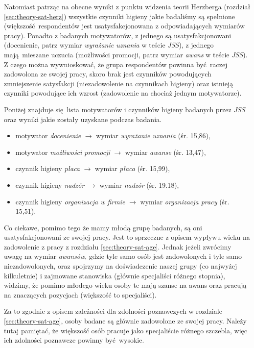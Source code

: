 Natomiast patrząc na obecne wyniki z punktu widzenia teorii Herzberga (rozdział \ref{sec:theory-sat-herz}) wszystkie czynniki higieny jakie badaliśmy są spełnione (większość respondentów jest usatysfakcjonowana z odpowiadających wymiarów pracy). Ponadto z badanych motywatorów, z jednego są usatysfakcjonowani (docenienie, patrz wymiar \textit{wyrażanie uznania} w teście \emph{JSS}), z jednego mają mieszane uczucia (możliwości promocji, patrz wymiar \textit{awans} w teście \emph{JSS}). Z czego można wywnioskować, że
grupa respondentów powinna być raczej zadowolona ze swojej pracy, skoro brak jest czynników powodujących zmniejszenie satysfakcji (niezadowolenie na czynnikach higieny) oraz istnieją czynniki powodujące ich wzrost (zadowolenie na chociaż jednym motywatorze). 

Poniżej znajduje się lista motywatorów i czynników higieny badanych przez \emph{JSS} oraz wyniki jakie zostały uzyskane podczas badania.

\begin{itemize}
  \item motywator \textit{docenienie} $\rightarrow$ wymiar \textit{wyrażanie uznania} (śr. 15,86),
  \item motywator \textit{możliwości promocji} $\rightarrow$ wymiar \textit{awanse} (śr. 13,47),
  \item czynnik higieny \textit{płaca} $\rightarrow$ wymiar \textit{płaca} (śr. 15,99),
  \item czynnik higieny \textit{nadzór} $\rightarrow$ wymiar \textit{nadzór} (śr. 19.18),
  \item czynnik higieny \textit{organizacja w firmie} $\rightarrow$ wymiar \textit{organizacja pracy} (śr. 15,51).
\end{itemize}

Co ciekawe, pomimo tego że mamy młodą grupę badanych, są oni usatysfakcjonowani ze swojej pracy. Jest to sprzeczne z opisem wypływu wieku na zadowolenie z pracy z rozdziału \ref{sec:theory-sat-age}. Jednak jeżeli zwrócimy uwagę na wymiar \textit{awansów}, gdzie tyle samo osób jest zadowolonych i tyle samo niezadowolonych, oraz spojrzymy na doświadczenie naszej grupy (co najwyżej kilkuletnie) i zajmowane stanowiska (głównie specjaliści różnego stopnia), widzimy, że pomimo młodego wieku
osoby te mają szanse na awans oraz pracują na znaczących pozycjach (większość to specjaliści).

Za to zgodnie z opisem zależności dla zdolności poznawczych w rozdziale \ref{sec:theory-sat-age}, osoby badane są głównie zadowolone ze swojej pracy. Należy tutaj pamiętać, że większość osób pracuje jako specjaliście różnego szczebla, więc ich zdolności poznawcze powinny być wysokie.

